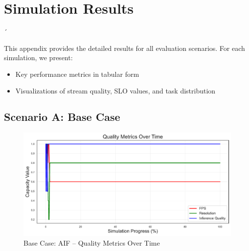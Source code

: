\appendix
\chapter{Simulation Results}
´\label{appendix:chap:simulation-results}

This appendix provides the detailed results for all evaluation scenarios. For each simulation, we present:
\begin{itemize}
    \item Key performance metrics in tabular form
    \item Visualizations of stream quality, SLO values, and task distribution
\end{itemize}


\section{Scenario A: Base Case}




\begin{figure}[h]
    \centering
    \includegraphics[width=\textwidth]{img/results/basic/active_inference_relative_control_quality_metrics.pdf}
    \caption{Base Case: AIF -- Quality Metrics Over Time}
\end{figure}

